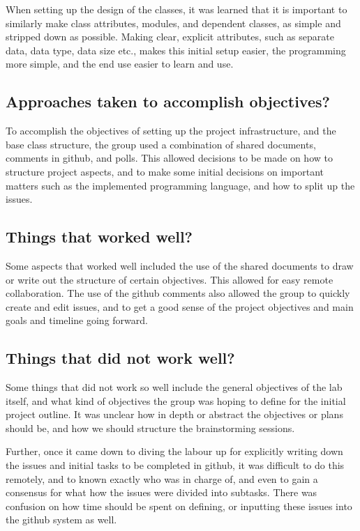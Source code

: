 \documentclass[letterpaper]{article}
\begin{document}
When setting up the design of the classes, it was learned that it is important to similarly make class attributes, modules, and dependent classes, as simple and stripped down as possible. Making clear, explicit attributes, such as separate data, data type, data size etc., makes this initial setup easier, the programming more simple, and the end use easier to learn and use.


\subsection{Approaches taken to accomplish objectives?}
To accomplish the objectives of setting up the project infrastructure, and the base class structure, the group used a combination of shared documents, comments in github, and polls. This allowed decisions to be made on how to structure project aspects, and to make some initial decisions on important matters such as the implemented programming language, and how to split up the issues.

\subsection{Things that worked well?}
Some aspects that worked well included the use of the shared documents to draw or write out the structure of certain objectives. This allowed for easy remote collaboration. The use of the github comments also allowed the group to quickly create and edit issues, and to get a good sense of the project objectives and main goals and timeline going forward.

\subsection{Things that did not work well?}
Some things that did not work so well include the general objectives of the lab itself, and what kind of objectives the group was hoping to define for the initial project outline. It was unclear how in depth or abstract the objectives or plans should be, and how we should structure the brainstorming sessions.

Further, once it came down to diving the labour up for explicitly writing down the issues and initial tasks to be completed in github, it was difficult to do this remotely, and to known exactly who was in charge of, and even to gain a consensus for what how the issues were divided into subtasks. There was confusion on how time should be spent on defining, or inputting these issues into the github system as well.
\end{document}

